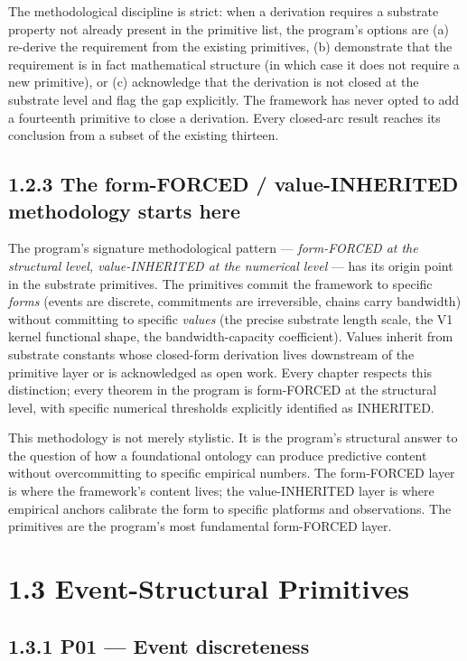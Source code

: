 \documentclass[11pt]{book}
\begin{document}
The methodological discipline is strict: when a derivation requires a substrate property not already present in the primitive list, the program's options are (a) re-derive the requirement from the existing primitives, (b) demonstrate that the requirement is in fact mathematical structure (in which case it does not require a new primitive), or (c) acknowledge that the derivation is not closed at the substrate level and flag the gap explicitly. The framework has never opted to add a fourteenth primitive to close a derivation. Every closed-arc result reaches its conclusion from a subset of the existing thirteen.

\subsection{1.2.3 The form-FORCED / value-INHERITED methodology starts here}

The program's signature methodological pattern — \textit{form-FORCED at the structural level, value-INHERITED at the numerical level} — has its origin point in the substrate primitives. The primitives commit the framework to specific \textit{forms} (events are discrete, commitments are irreversible, chains carry bandwidth) without committing to specific \textit{values} (the precise substrate length scale, the V1 kernel functional shape, the bandwidth-capacity coefficient). Values inherit from substrate constants whose closed-form derivation lives downstream of the primitive layer or is acknowledged as open work. Every chapter respects this distinction; every theorem in the program is form-FORCED at the structural level, with specific numerical thresholds explicitly identified as INHERITED.

This methodology is not merely stylistic. It is the program's structural answer to the question of how a foundational ontology can produce predictive content without overcommitting to specific empirical numbers. The form-FORCED layer is where the framework's content lives; the value-INHERITED layer is where empirical anchors calibrate the form to specific platforms and observations. The primitives are the program's most fundamental form-FORCED layer.

\section{1.3 Event-Structural Primitives}

\subsection{1.3.1 P01 — Event discreteness}
\end{document}
